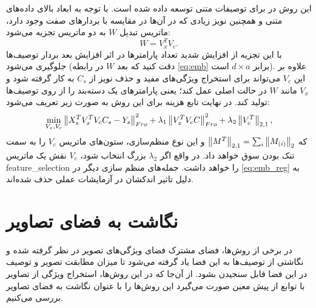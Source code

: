این روش در
\cite{lessismore}
برای توصیفات متنی توسعه داده شده است. با توجه به ابعاد بالای داده‌های متنی و همچنین نویز زیادی که در آن‌ها در مقایسه با بردارهای صفت وجود دارد، ماتریس تبدیل $W$ به دو ماتریس تجزیه می‌شود:
\begin{equation}
W = V_x^T V_c.
\end{equation}
با این تجزیه از افزایش شدید تعداد پارامترها در اثر افزایش بعد بردار توصیف‌ها جلوگیری می‌شود (دقت کنید که بعد  $W$ در رابطه \eqref{eq:emb} برابر $d\times a$ است). علاوه بر این $V_c$ می‌تواند برای استخراج ویژگی‌های مفید و حذف نویز از  $C_s$ به  کار گرفته شود و $V_x$ مانند $W$ در حالت اصلی عمل کند؛ یعنی پارامترهای یک دسته‌بند را از روی توصیف‌ها تولید کند. در نهایت تابع هزینه برای این روش به صورت زیر تعریف می‌شود:
\begin{equation}
\min_{V_x, V_c} \left \lVert X_s^T V_x^T V_c C_s - Y_s \right \rVert_{Fro}^2 + \lambda_1 \left \lVert  V_x^T V_c C \right \rVert_{Fro}^2 +
\lambda_2 \left \lVert V_c^T \right \rVert_{2,1},
\end{equation}
که
$\left \lVert M^T \right \rVert_{2,1} = \sum_i \left \lVert M_{(i)} \right \rVert_2 $
و این نوع منظم‌سازی، ستون‌های ماتریس $V_c$ را به سمت تنک بودن سوق خواهد داد. در واقع اگر $\lambda_2$ بزرگ انتخاب شود، $V_c$ نقش یک ماتریس \gls{feature_selection}
را خواهد داشت. جمله‌های منظم سازی دیگر در
\eqref{eq:emb_reg}
به دلیل تاثیر اندکشان در آزمایشات عملی حذف شده‌اند.


\section{نگاشت به فضای تصاویر}\label{to_images}
در برخی از روش‌ها، فضای مشترک فضای ویژگی‌های تصویر در نظر گرفته شده و نگاشتی از توصیف‌ها به این فضا یاد گرفته می‌شود تا میزان مطابقت تصویر و توصیف در این فضا قابل سنجیدن بشود. از آن‌جا که در این روش‌‌ها، استخراج ویژگی از تصاویر با توابع از پیش معین صورت می‌گیرد این روش‌ها را با عنوان نگاشت به فضای تصاویر بررسی می‌کنیم.


